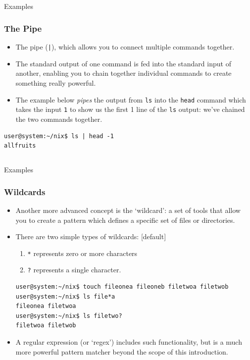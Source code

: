 \documentclass[10pt]{beamer}
\begin{document}
\subsection{}
\begin{frame}[fragile]{Examples}
\frametitle{The Pipe}
\begin{itemize}
\item The pipe (\texttt{|}), which allows you to connect multiple commands together.\vspace{0.1in}
\item The standard output of one command is fed into the standard input of another, enabling you to chain together individual commands to create something really powerful.\vspace{0.1in}
\item The example below \emph{pipes} the output from \texttt{ls} into the \texttt{head} command which takes the input \texttt{1} to show us the first 1 line of the \texttt{ls} output: we've chained the two commands together.
\end{itemize}
\begin{table}
\begin{lstlisting}[style=BashInputStyle]
user@system:~/nix$ ls | head -1
allfruits
\end{lstlisting}
\end{table}
\end{frame}

\subsection{}
\begin{frame}[fragile]{Examples}
\frametitle{Wildcards}
\begin{itemize}
\item Another more advanced concept is the `wildcard': a set of tools that allow you to create a pattern which defines a specific set of files or directories.\vspace{0.1in}
\item There are two simple types of wildcards: 
[default]
\begin{enumerate}
\item \texttt{*} represents zero or more characters
\item \texttt{?} represents a single character.
\end{enumerate}
\begin{table}
\begin{lstlisting}[style=BashInputStyle]
user@system:~/nix$ touch fileonea fileoneb filetwoa filetwob
user@system:~/nix$ ls file*a
fileonea filetwoa
user@system:~/nix$ ls filetwo?
filetwoa filetwob
\end{lstlisting}
\end{table}
\item A regular expression (or `regex') includes such functionality, but is a much more powerful pattern matcher beyond the scope of this introduction.
\end{itemize}
\end{frame}
\end{document}
